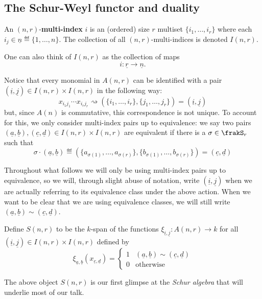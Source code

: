 \documentclass[12pt]{article}
\begin{document}
	\subsection{The Schur-Weyl functor and duality}
	\begin{defn}
		An $(n,r)$-\textbf{multi-index} $i$ is an (ordered) size $r$ multiset $\{i_1,\dots,i_r\}$ where each $i_j\in\underline n\eqdef\{1,\dots,n\}$.
		The collection of all $(n,r)$-multi-indices is denoted $I(n,r)$.
	\end{defn}
	\begin{rmk}
		One can also think of $I(n,r)$ as the collection of maps
		\[i:\underline r\to\underline n.\]
	\end{rmk}
	Notice that every monomial in $A(n,r)$ can be identified with a pair $(\underline i,\underline j)\in I(n,r)\times I(n,r)$ in the following way:
	\[x_{i_1j_1}\cdots x_{i_rj_r}\rightsquigarrow (\{i_1,\dots,i_r\},\{j_1,\dots,j_r\})=(\underline i,\underline j)\]
	but, since $A(n)$ is commutative, this correspondence is not unique. To account for this, we only consider multi-index pairs 
	up to equivalence: we say two pairs $(\underline a,\underline b),(\underline c,\underline d)\in I(n,r)\times I(n,r)$ are equivalent if 
	there is a $\sigma\in\frakS_r$ such that 
	\[\sigma\cdot(\underline a,\underline b)\eqdef(\{a_{\sigma(1)},\dots,a_{\sigma(r)}\},\{b_{\sigma(1)},\dots,b_{\sigma(r)}\})=(\underline c,\underline d)\]
	\begin{rmk}
		Throughout what follows we will only be using multi-index pairs up to equivalence, so 
		we will, through slight abuse of notation, write $(\underline i,\underline j)$ when we are actually 
		referring to its equivalence class under the above action. When we want to be clear that 
		we are using equivalence classes, we will still write $(\underline a,\underline b)\sim(\underline c,\underline d)$.
	\end{rmk}
	\begin{defn}
		Define $S(n,r)$ to be the $k$-span of the functions $\xi_{\underline i,\underline j}:A(n,r)\to k$ for all $(\underline i,\underline j)\in I(n,r)\times I(n,r)$
		defined by 
		\[\xi_{\underline a,\underline b}(x_{\underline c,\underline d})=\begin{cases}
			1& (\underline a,\underline b)\sim(\underline c,\underline d)\\
			0 & \text{otherwise}
		\end{cases}\]
	\end{defn}
	\begin{rmk}
		The above object $S(n,r)$ is our first glimpse at the \textit{Schur algebra} that will underlie most of our talk.
	\end{rmk}
\end{document}

